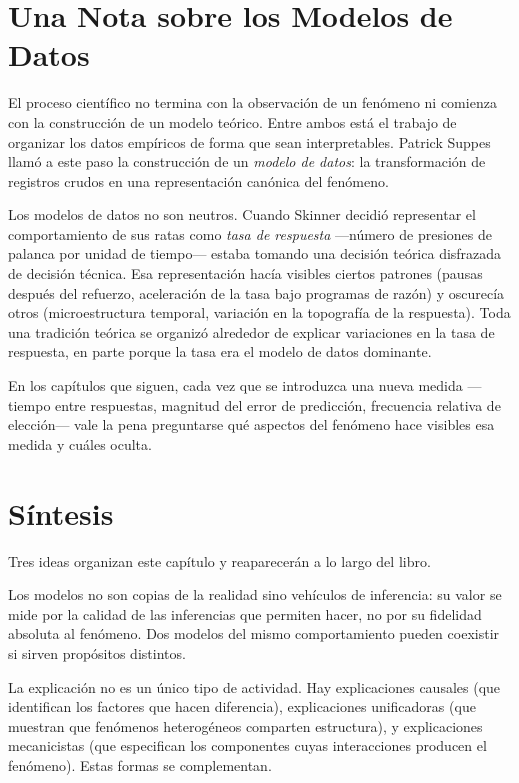 \documentclass[
  letterpaper,
  DIV=11,
  numbers=noendperiod]{scrreprt}
\begin{document}
\section{Una Nota sobre los Modelos de
Datos}\label{una-nota-sobre-los-modelos-de-datos}

El proceso científico no termina con la observación de un fenómeno ni
comienza con la construcción de un modelo teórico. Entre ambos está el
trabajo de organizar los datos empíricos de forma que sean
interpretables. Patrick Suppes llamó a este paso la construcción de un
\emph{modelo de datos}: la transformación de registros crudos en una
representación canónica del fenómeno.

Los modelos de datos no son neutros. Cuando Skinner decidió representar
el comportamiento de sus ratas como \emph{tasa de respuesta} ---número
de presiones de palanca por unidad de tiempo--- estaba tomando una
decisión teórica disfrazada de decisión técnica. Esa representación
hacía visibles ciertos patrones (pausas después del refuerzo,
aceleración de la tasa bajo programas de razón) y oscurecía otros
(microestructura temporal, variación en la topografía de la respuesta).
Toda una tradición teórica se organizó alrededor de explicar variaciones
en la tasa de respuesta, en parte porque la tasa era el modelo de datos
dominante.

En los capítulos que siguen, cada vez que se introduzca una nueva medida
---tiempo entre respuestas, magnitud del error de predicción, frecuencia
relativa de elección--- vale la pena preguntarse qué aspectos del
fenómeno hace visibles esa medida y cuáles oculta.

\section{Síntesis}\label{suxedntesis}

Tres ideas organizan este capítulo y reaparecerán a lo largo del libro.

Los modelos no son copias de la realidad sino vehículos de inferencia:
su valor se mide por la calidad de las inferencias que permiten hacer,
no por su fidelidad absoluta al fenómeno. Dos modelos del mismo
comportamiento pueden coexistir si sirven propósitos distintos.

La explicación no es un único tipo de actividad. Hay explicaciones
causales (que identifican los factores que hacen diferencia),
explicaciones unificadoras (que muestran que fenómenos heterogéneos
comparten estructura), y explicaciones mecanicistas (que especifican los
componentes cuyas interacciones producen el fenómeno). Estas formas se
complementan.
\end{document}
